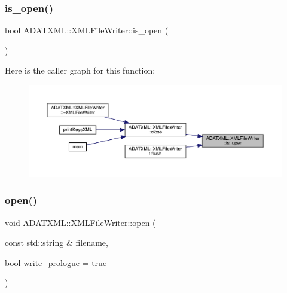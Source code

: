\mbox{\label{classADATXML_1_1XMLFileWriter_a60fa87bbd9300c37386f9fdcb9460f74}} 
\subsubsection{\texorpdfstring{is\_open()}{is\_open()}\hspace{0.1cm}{\footnotesize\ttfamily [2/2]}}
{\footnotesize\ttfamily bool A\+D\+A\+T\+X\+M\+L\+::\+X\+M\+L\+File\+Writer\+::is\+\_\+open (\begin{DoxyParamCaption}{ }\end{DoxyParamCaption})}

Here is the caller graph for this function\+:\nopagebreak
\begin{figure}[H]
\begin{center}
\leavevmode
\includegraphics[width=350pt]{d6/ddb/classADATXML_1_1XMLFileWriter_a60fa87bbd9300c37386f9fdcb9460f74_icgraph}
\end{center}
\end{figure}
\mbox{\label{classADATXML_1_1XMLFileWriter_a76f52e7ccdfe3b82875f30953cfd2447}} 
\subsubsection{\texorpdfstring{open()}{open()}\hspace{0.1cm}{\footnotesize\ttfamily [1/2]}}
{\footnotesize\ttfamily void A\+D\+A\+T\+X\+M\+L\+::\+X\+M\+L\+File\+Writer\+::open (\begin{DoxyParamCaption}\item[{const std\+::string \&}]{filename,  }\item[{bool}]{write\+\_\+prologue = {\ttfamily true} }\end{DoxyParamCaption})\hspace{0.3cm}{\ttfamily [inline]}}


